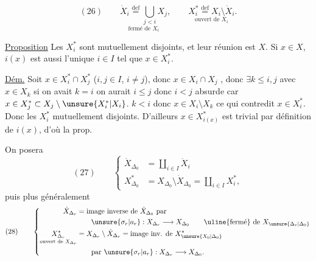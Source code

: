 \[
(26)\qquad
\underset{\text{fermé de }X_i}{\dot X_i\overset{\mathrm{def}}=\bigcup_{j<i}X_j},
\qquad
\underset{\text{ouvert de }X_i}{X_i^*\overset{\mathrm{def}}=X_i\setminus\dot X_i}.
\]


\uline{Proposition} Les $X_i^*$ sont mutuellement disjoints, et leur réunion est $X$. Si $x\in X$, $i(x)$ est aussi l'unique $i\in I$ tel que $x\in X_i^*$.

\uline{Dém.} Soit $x\in X_i^*\cap X_j^*$ ($i,j\in I$, $i\ne j$), donc  $x\in X_i\cap X_j$ , donc $\exists k\leq i,j$ avec
$x\in X_k$ si on avait $k=i$ on aurait $i\leq j$ donc $i<j$ absurde car $x\in X_j^*\subset X_j\setminus\unsure{X_i^*|X_i}$.
 $k<i$ donc $x\in X_i\setminus X_k$ ce qui contredit $x\in X_i^*$. Donc les $X_i^*$ mutuellement disjoints. D'ailleurs $x\in X_{i(x)}^*$ est trivial par définition de $i(x)$, d'où la prop.

On posera
\[
(27)\qquad
\left\{\begin{aligned}
\dot X_{\Delta_0}&=\coprod_{i\in I}\dot X_i\\
X_{\Delta_0}^*&=X_{\Delta_0}\setminus\dot X_{\Delta_0}=\coprod_{i\in I}X_i^*,
\end{aligned}\right.
\]
puis  plus généralement
\[
(28)\qquad
\left\{\begin{aligned}
\dot X_{\Delta_r}&=\text{image inverse de }\dot X_{\Delta_0}\text{ par}\\
&\qquad\unsure{\sigma_r|a_r}:X_{\Delta_r}\longrightarrow X_{\Delta_0}
\qquad\text{\uline{fermé} de }X_{\unsure{\Delta_r|\Delta_0}}\\
\underset{\text{ouvert de }X_{\Delta_r}}{X_{\Delta_r}^*}&=X_{\Delta_r}\setminus\dot X_{\Delta_r}=\text{image inv. de }X_{\unsure{X_0|\Delta_0}}^*\\
&\qquad\text{par }\unsure{\sigma_r|a_r}:X_{\Delta_r}\longrightarrow X_{\Delta_0}.
\end{aligned}\right.
\]
